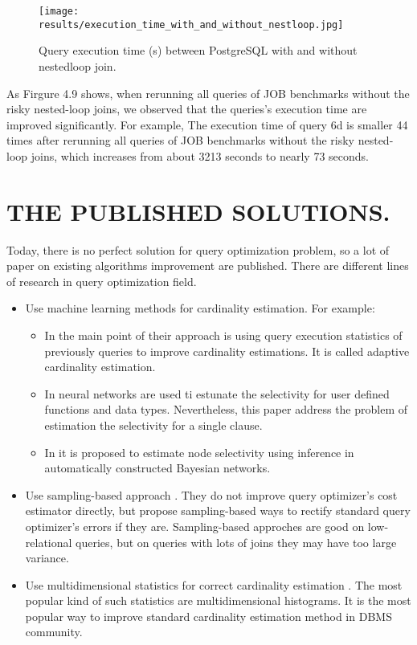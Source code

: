 \vspace{0.5cm}
\newpage
{
\begin{figure}[H]
\centering
\texttt{[image: results/execution\_time\_with\_and\_without\_nestloop.jpg]}
\caption{Query execution time (s) between  PostgreSQL with and without nestedloop join.}
\end{figure}
}
{\justify
As Firgure 4.9 shows, when rerunning all queries of JOB benchmarks without the risky nested-loop joins, we observed that the queries's execution time are improved significantly. For example, The execution time of query 6d is smaller 44 times after rerunning all queries of JOB benchmarks without the risky nested-loop joins, which increases from about 3213 seconds to nearly 73 seconds.
\par }
\section{THE PUBLISHED SOLUTIONS.}
{\justify
Today, there is no perfect solution for query optimization problem, so a lot of paper on existing algorithms improvement are published. There are different lines of research in query optimization field.
\begin{itemize}
\item Use machine learning methods for cardinality estimation. For example:
\begin{itemize}
\item In \cite{adaptive cardinality estimation} the main point of their approach is using query execution statistics of previously queries to improve cardinality estimations. It is called adaptive cardinality estimation.
\item In \cite{neural network approach} neural networks are used ti estunate the selectivity for user defined functions and data types. Nevertheless, this paper address the problem of estimation the selectivity for a single clause.
\item In \cite{probabilistic models} it is proposed to estimate node selectivity using inference in automatically constructed Bayesian networks. 
\end{itemize}
\item Use sampling-based approach \cite{sampling-based,cost models are unusable}. They do not improve query optimizer's cost estimator directly, but propose sampling-based ways to rectify standard query optimizer's errors if they are. Sampling-based approches are good on low-relational queries, but on queries with lots of joins they may have too large variance.
\item Use multidimensional statistics for correct cardinality estimation \cite{A multidimensional workload-aware histogram,multidimensional range queries}. The most popular kind of such statistics are multidimensional histograms. It is the most popular way to improve standard cardinality estimation method in DBMS community.
\end{itemize}
\par }
